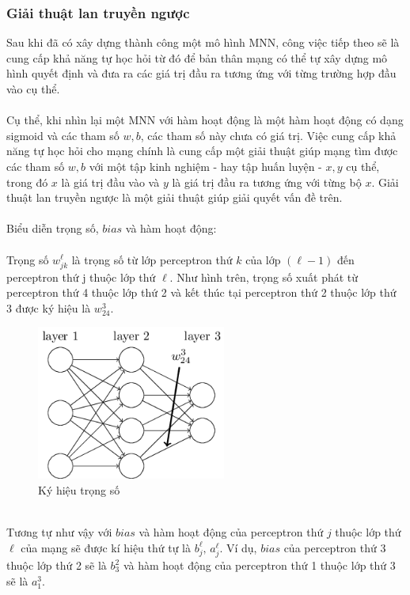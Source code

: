 \subsubsection{Giải thuật lan truyền ngược}
Sau khi đã có xây dựng thành công một mô hình MNN, công việc tiếp theo sẽ là 
cung cấp khả năng tự học hỏi từ đó để bản thân mạng có thể tự xây dựng mô hình 
quyết định và đưa ra các giá trị đầu ra tương ứng với từng trường hợp đầu vào 
cụ thể.\\\\
Cụ thể, khi nhìn lại một MNN với hàm hoạt động là một hàm hoạt động có dạng
sigmoid và các tham số $w, b$, các tham số này chưa có giá trị.  Việc cung 
cấp khả năng tự học hỏi cho mạng chính là cung cấp một giải thuật giúp mạng 
tìm được các tham số $w, b$ với một tập kinh nghiệm - hay tập huấn luyện - 
${x, y}$ cụ thể, trong đó $x$ là giá trị đầu vào và $y$ là giá trị đầu ra 
tương ứng với từng bộ $x$. Giải thuật lan truyền ngược là một giải thuật giúp 
giải quyết vấn đề trên.\\\\
Biểu diễn trọng số, $bias$ và hàm hoạt động:\\\\
Trọng số $w_{jk}^\ell$ là trọng số từ lớp perceptron thứ $k$ của lớp $(\ell-1)$ 
đến perceptron thứ j thuộc lớp thứ $\ell$.
Như hình trên, trọng số xuất phát từ perceptron thứ 4 thuộc lớp thứ 2 và kết 
thúc tại perceptron thứ 2 thuộc lớp thứ 3 được ký hiệu là $w_{24}^3$.\\
\begin{figure}[h!]
\centering
\includegraphics[height=2in, keepaspectratio=true]{exw.png}
\caption{Ký hiệu trọng số}
\end{figure}\\
Tương tự như vậy với $bias$ và hàm hoạt động của perceptron thứ $j$ thuộc lớp 
thứ $\ell$ của mạng sẽ được kí hiệu thứ tự là $b_j^\ell,\,a_j^\ell$. Ví dụ, $bias$ 
của perceptron thứ 3 thuộc lớp thứ 2 sẽ là $b_3^2$ và hàm hoạt động của 
perceptron thứ 1 thuộc lớp thứ 3 sẽ là $a_1^3$.\\
